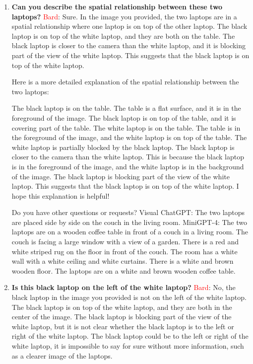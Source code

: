 \begin{enumerate}
    \item \textbf{Can you describe the spatial relationship between these two laptops?}
    \subitem \textcolor{Red}{Bard}: Sure. In the image you provided, the two laptops are in a spatial relationship where one laptop is on top of the other laptop. The black laptop is on top of the white laptop, and they are both on the table. The black laptop is closer to the camera than the white laptop, and it is blocking part of the view of the white laptop. This suggests that the black laptop is on top of the white laptop.

    Here is a more detailed explanation of the spatial relationship between the two laptops:
    
    The black laptop is on the table. The table is a flat surface, and it is in the foreground of the image. The black laptop is on top of the table, and it is covering part of the table.
    The white laptop is on the table. The table is in the foreground of the image, and the white laptop is on top of the table. The white laptop is partially blocked by the black laptop.
    The black laptop is closer to the camera than the white laptop. This is because the black laptop is in the foreground of the image, and the white laptop is in the background of the image.
    The black laptop is blocking part of the view of the white laptop. This suggests that the black laptop is on top of the white laptop.
    I hope this explanation is helpful!
    
    Do you have other questions or requests?
    \subitem Visual ChatGPT: The two laptops are placed side by side on the couch in the living room.
    \subitem MiniGPT-4: The two laptops are on a wooden coffee table in front of a couch in a living room. The couch is facing a large window with a view of a garden. There is a red and white striped rug on the floor in front of the couch. The room has a white wall with a white ceiling and white curtains. There is a white and brown wooden floor. The laptops are on a white and brown wooden coffee table.
    \item \textbf{Is this black laptop on the left of the white laptop?}
    \subitem \textcolor{Red}{Bard}: No, the black laptop in the image you provided is not on the left of the white laptop. The black laptop is on top of the white laptop, and they are both in the center of the image. The black laptop is blocking part of the view of the white laptop, but it is not clear whether the black laptop is to the left or right of the white laptop. The black laptop could be to the left or right of the white laptop, it is impossible to say for sure without more information, such as a clearer image of the laptops.


\end{enumerate}
